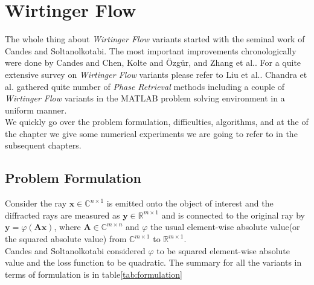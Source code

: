 \chapter{Wirtinger Flow}

The whole thing about \emph{Wirtinger Flow} variants started with the seminal work of Candes and Soltanolkotabi\cite{wirtinger_flow_cadnes}.
The most important improvements chronologically were done by Candes and Chen\cite{truncated_wirtinger_flow}, Kolte and Özgür\cite{incrementaly_truncated_wirtinger_flow}, and Zhang et al.\cite{reshaped_and_incrementally_reshaped_wirtinger_flow}.
For a quite extensive survey on \emph{Wirtinger Flow} variants please refer to Liu et al.\cite{wirtinger_flow_variants_survey}. Chandra et al.\cite{phase_pack} 
gathered quite number of \emph{Phase Retrieval} methods including a couple of \emph{Wirtinger Flow} variants in the MATLAB\textregistered\space 
problem solving environment in a uniform manner.\\
We quickly go over the problem formulation, difficulties, algorithms, and at the of the chapter we give some numerical experiments we are going
to refer to in the subsequent chapters.

\section{Problem Formulation}
Consider the ray $\boldsymbol{x} \in \mathbb{C}^{n \times 1}$ is emitted onto the object of interest and the diffracted rays are measured as 
$\boldsymbol{y} \in \mathbb{R}^{m \times 1}$ and is connected to the original ray by $\boldsymbol{y} = \varphi(\boldsymbol{A}\boldsymbol{x})$,
where $\boldsymbol{A} \in \mathbb{C}^{m \times n}$ and $\varphi$ the usual element-wise absolute value(or the squared absolute value) from 
$\mathbb{C}^{m \times 1}$ to $\mathbb{R}^{m \times 1}$.\\
Candes and Soltanolkotabi\cite{wirtinger_flow_cadnes} considered $\varphi$ to be squared element-wise absolute value and the loss function to be quadratic. 
The summary for all the variants in terms of formulation is in table\ref{tab:formulation}  


